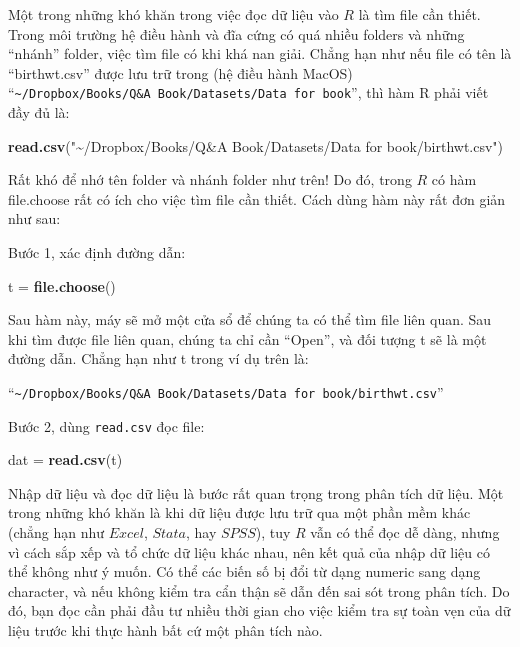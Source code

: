 \documentclass[
]{book}
\newenvironment{Shaded}{\begin{snugshade}}{\end{snugshade}}
\newcommand{\KeywordTok}[1]{\textcolor[rgb]{0.13,0.29,0.53}{\textbf{#1}}}
\newcommand{\NormalTok}[1]{#1}
\newcommand{\StringTok}[1]{\textcolor[rgb]{0.31,0.60,0.02}{#1}}
\begin{document}
Một trong những khó khăn trong việc đọc dữ liệu vào \(R\) là tìm file cần thiết. Trong môi trường hệ điều hành và đĩa cứng có quá nhiều folders và những ``nhánh'' folder, việc tìm file có khi khá nan giải. Chẳng hạn như nếu file có tên là ``birthwt.csv'' được lưu trữ trong (hệ điều hành MacOS) ``\texttt{\textasciitilde{}/Dropbox/Books/Q\&A\ Book/Datasets/Data\ for\ book}'', thì hàm R phải viết đầy đủ là:

\begin{Shaded}
\begin{Highlighting}[]
\KeywordTok{read.csv}\NormalTok{(}\StringTok{"\textasciitilde{}/Dropbox/Books/Q\&A Book/Datasets/Data for book/birthwt.csv"}\NormalTok{)}
\end{Highlighting}
\end{Shaded}

Rất khó để nhớ tên folder và nhánh folder như trên! Do đó, trong \(R\) có hàm file.choose rất có ích cho việc tìm file cần thiết. Cách dùng hàm này rất đơn giản như sau:

Bước 1, xác định đường dẫn:

\begin{Shaded}
\begin{Highlighting}[]
\NormalTok{t =}\StringTok{ }\KeywordTok{file.choose}\NormalTok{()}
\end{Highlighting}
\end{Shaded}

Sau hàm này, máy sẽ mở một cửa sổ để chúng ta có thể tìm file liên quan. Sau khi tìm được file liên quan, chúng ta chỉ cần ``Open'', và đối tượng t sẽ là một đường dẫn. Chẳng hạn như t trong ví dụ trên là:

``\texttt{\textasciitilde{}/Dropbox/Books/Q\&A\ Book/Datasets/Data\ for\ book/birthwt.csv}''

Bước 2, dùng \texttt{read.csv} đọc file:

\begin{Shaded}
\begin{Highlighting}[]
\NormalTok{dat =}\StringTok{ }\KeywordTok{read.csv}\NormalTok{(t)}
\end{Highlighting}
\end{Shaded}

Nhập dữ liệu và đọc dữ liệu là bước rất quan trọng trong phân tích dữ liệu. Một trong những khó khăn là khi dữ liệu được lưu trữ qua một phần mềm khác (chẳng hạn như \(Excel\), \(Stata\), hay \(SPSS\)), tuy \(R\) vẫn có thể đọc dễ dàng, nhưng vì cách sắp xếp và tổ chức dữ liệu khác nhau, nên kết quả của nhập dữ liệu có thể không như ý muốn. Có thể các biến số bị đổi từ dạng numeric sang dạng character, và nếu không kiểm tra cẩn thận sẽ dẫn đến sai sót trong phân tích. Do đó, bạn đọc cần phải đầu tư nhiều thời gian cho việc kiểm tra sự toàn vẹn của dữ liệu trước khi thực hành bất cứ một phân tích nào.
\end{document}
